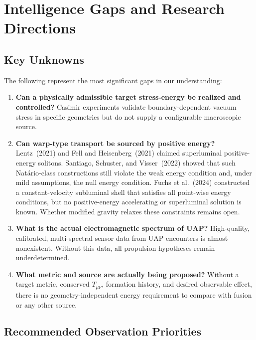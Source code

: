 \documentclass[aps,prd,twocolumn,superscriptaddress,nofootinbib,floatfix]{revtex4-2}
\begin{document}
\section{Intelligence Gaps and Research Directions}\label{sec:research}

\subsection{Key Unknowns}\label{sec:unknowns}

The following represent the most significant gaps in our understanding:
\begin{enumerate}
  \item \textbf{Can a physically admissible target stress-energy be realized and
        controlled?} Casimir experiments validate boundary-dependent vacuum
        stress in specific geometries but do not supply a configurable
        macroscopic source.
  \item \textbf{Can warp-type transport be sourced by positive energy?}
        Lentz~(2021) and Fell and Heisenberg~(2021) claimed superluminal
        positive-energy solitons. Santiago, Schuster, and Visser~(2022) showed
        that such Nat\'ario-class constructions still violate the weak energy
        condition and, under mild assumptions, the null energy condition. Fuchs
        et al.~(2024) constructed a constant-velocity subluminal shell that
        satisfies all point-wise energy conditions, but no positive-energy
        accelerating or superluminal solution is known. Whether modified gravity
        relaxes these constraints remains open.
  \item \textbf{What is the actual electromagnetic spectrum of UAP?}
        High-quality, calibrated, multi-spectral sensor data from UAP encounters
        is almost nonexistent. Without this data, all propulsion hypotheses remain
        underdetermined.
  \item \textbf{What metric and source are actually being proposed?} Without a
        target metric, conserved $T_{\mu\nu}$, formation history, and desired
        observable effect, there is no geometry-independent energy requirement to
        compare with fusion or any other source.
\end{enumerate}

\subsection{Recommended Observation Priorities}\label{sec:observation}
\end{document}
